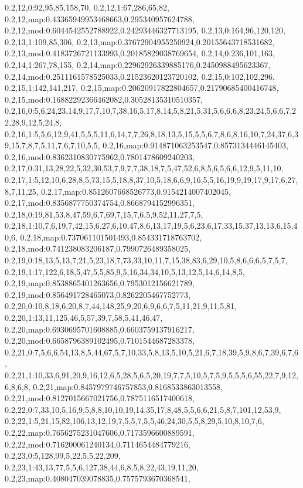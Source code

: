 0.2,12,0:92,95,85,158,70,
0.2,12,1:67,286,65,82,
0.2,12,map:0.43365949953468663,0.295340957624788,
0.2,12,mod:0.6044542552788922,0.24293446327713195,
0.2,13,0:164,96,120,120,
0.2,13,1:109,85,306,
0.2,13,map:0.37672904955250924,0.20155643718531682,
0.2,13,mod:0.4183726721133993,0.20185829038769654,
0.2,14,0:236,101,163,
0.2,14,1:267,78,155,
0.2,14,map:0.22962926339885176,0.2450988495623367,
0.2,14,mod:0.2511161578525033,0.21523620123720102,
0.2,15,0:102,102,296,
0.2,15,1:142,141,217,
0.2,15,map:0.20620917822804657,0.21790685400416748,
0.2,15,mod:0.16882292366462082,0.30528135310510357,
0.2,16,0:5,6,24,23,14,9,17,7,10,7,38,16,5,17,8,14,5,8,21,5,31,5,6,6,6,8,23,24,5,6,6,7,22,28,9,12,5,24,8,
0.2,16,1:5,5,6,12,9,41,5,5,5,11,6,14,7,7,26,8,18,13,5,15,5,5,6,7,8,6,8,16,10,7,24,37,6,39,15,7,8,7,5,11,7,6,7,10,5,5,
0.2,16,map:0.914871063253547,0.8573134446145403,
0.2,16,mod:0.8362310830775962,0.7801478609240203,
0.2,17,0:31,13,28,22,5,32,30,53,7,9,7,7,38,18,7,5,47,52,6,8,5,6,5,6,6,12,9,5,11,10,
0.2,17,1:5,12,10,6,28,8,5,73,15,5,18,8,37,10,5,18,6,6,9,16,5,5,16,19,9,19,17,9,17,6,27,8,7,11,25,
0.2,17,map:0.8512607668526773,0.9154214007402045,
0.2,17,mod:0.8356877750374754,0.8668794152996351,
0.2,18,0:19,81,53,8,47,59,6,7,69,7,15,7,6,5,9,52,11,27,7,5,
0.2,18,1:10,7,6,19,7,42,15,6,27,6,10,47,8,6,13,17,19,5,6,23,6,17,33,15,37,13,13,6,15,40,6,
0.2,18,map:0.737061101501493,0.854331718763702,
0.2,18,mod:0.741238083206187,0.7990726489358025,
0.2,19,0:18,13,5,13,7,21,5,23,18,7,73,33,10,11,7,15,38,83,6,29,10,5,8,6,6,6,5,7,5,7,
0.2,19,1:17,122,6,18,5,47,5,5,85,9,5,16,34,34,10,5,13,12,5,14,6,14,8,5,
0.2,19,map:0.8538865401263656,0.7953012156621789,
0.2,19,mod:0.856491728465073,0.8262205467752773,
0.2,20,0:10,8,18,6,20,8,7,44,148,25,9,20,6,9,6,6,7,5,11,21,9,11,5,81,
0.2,20,1:13,11,125,46,5,57,39,7,58,5,41,46,47,
0.2,20,map:0.6930695701608885,0.6603759137916217,
0.2,20,mod:0.6658796389102495,0.7101544687283378,
0.2,21,0:7,5,6,6,54,13,8,5,44,67,5,7,10,33,5,8,13,5,10,5,21,6,7,18,39,5,9,8,6,7,39,6,7,6,
0.2,21,1:10,33,6,91,20,9,16,12,6,5,28,5,6,5,20,19,7,7,5,10,5,7,5,9,5,5,5,6,55,22,7,9,12,6,8,6,8,
0.2,21,map:0.8457979746757853,0.8168533863013558,
0.2,21,mod:0.8127015667021756,0.7875116517400618,
0.2,22,0:7,33,10,5,16,9,5,8,8,10,10,19,14,35,17,8,48,5,5,6,6,21,5,8,7,101,12,53,9,
0.2,22,1:5,21,15,82,106,13,12,19,7,5,5,7,5,5,46,24,30,5,5,8,29,5,10,8,10,7,6,
0.2,22,map:0.7656275231047606,0.7173596600889591,
0.2,22,mod:0.716200061240134,0.7114654484779216,
0.2,23,0:5,128,99,5,22,5,5,22,209,
0.2,23,1:43,13,77,5,5,6,127,38,44,6,8,5,8,22,43,19,11,20,
0.2,23,map:0.408047039078835,0.7575793670368541,
